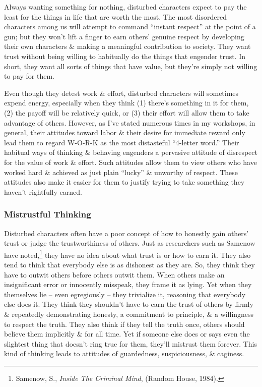 \documentclass{article}
\numberwithin{equation}{section}
\begin{document}
Always wanting something for nothing, disturbed characters expect to pay the least for the things in life that are worth the most. The most disordered characters among us will attempt to command ``instant respect'' at the point of a gun; but they won't lift a finger to earn others' genuine respect by developing their own characters \& making a meaningful contribution to society. They want trust without being willing to habitually do the things that engender trust. In short, they want all sorts of things that have value, but they're simply not willing to pay for them.

Even though they detest work \& effort, disturbed characters will sometimes expend energy, especially when they think (1) there's something in it for them, (2) the payoff will be relatively quick, or (3) their effort will allow them to take advantage of others. However, as I've stated numerous times in my workshops, in general, their attitudes toward labor \& their desire for immediate reward only lead them to regard W-O-R-K as the most distasteful ``4-letter word.'' Their habitual ways of thinking \& behaving engenders a pervasive attitude of disrespect for the value of work \& effort. Such attitudes allow them to view others who have worked hard \& achieved as just plain ``lucky'' \& unworthy of respect. These attitudes also make it easier for them to justify trying to take something they haven't rightfully earned.

\subsubsection{Mistrustful Thinking}
Disturbed characters often have a poor concept of how to honestly gain others' trust or judge the trustworthiness of others. Just as researchers such as Samenow have noted,\footnote{Samenow, S., {\it Inside The Criminal Mind}, (Random House, 1984).} they have no idea about what trust is or how to earn it. They also tend to think that everybody else is as dishonest as they are. So, they think they have to outwit others before others outwit them. When others make an insignificant error or innocently misspeak, they frame it as lying. Yet when they themselves lie -- even egregiously -- they trivialize it, reasoning that everybody else does it. They think they shouldn't have to earn the trust of others by firmly \& repeatedly demonstrating honesty, a commitment to principle, \& a willingness to respect the truth. They also think if they tell the truth once, others should believe them implicitly \& for all time. Yet if someone else does or says even the slightest thing that doesn't ring true for them, they'll mistrust them forever. This kind of thinking leads to attitudes of guardedness, suspiciousness, \& caginess.
\end{document}
